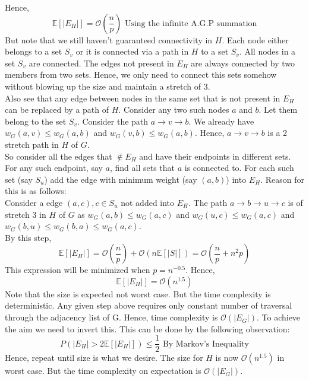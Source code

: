 \documentclass[12pt]{article}
\begin{document}
Hence,
\[ \mathbb{E}[|E_H|] = \mathcal{O}(\frac{n}{p}) \text{\ \ \  Using the infinite A.G.P summation} \]
But note that we still haven't guaranteed connectivity in $H$. Each node either belongs to a set $S_v$ or it is connected via a path in $H$ to a set $S_v$. All nodes in a set $S_v$ are connected. The edges not present in $E_H$ are always connected by two members from two sets. Hence, we only need to connect this sets somehow without blowing up the size and maintain a stretch of 3.
\\
Also see that any edge between nodes in the same set that is not present in $E_H$ can be replaced by a path of $H$.
Consider any two such nodes $a$ and $b$. Let them belong to the set $S_v$. Consider the path $a \rightarrow v \rightarrow b$. We already have $w_G(a, v) \leq w_G(a, b)$ and $w_G(v, b) \leq w_G(a, b)$. Hence, $a \rightarrow v \rightarrow b$ is a 2 stretch path in $H$ of $G$.
\\
So consider all the edges that $\notin E_H$ and have their endpoints in different sets. For any such endpoint, say $a$, find all sets that $a$ is connected to. For each such set (say $S_u$) add the edge with minimum weight (say $(a, b)$) into $E_H$. Reason for this is as follows:
\\
Consider a edge $(a, c), c \in S_u$ not added into $E_H$. The path $a \rightarrow b \rightarrow u \rightarrow c$ is of stretch 3 in $H$ of $G$ as $w_G(a, b) \leq w_G(a, c)$ and $w_G(u, c) \leq w_G(a, c)$ and $w_G(b, u) \leq w_G(b, a) \leq w_G(a, c)$.
\\
By this step,
\[ \mathbb{E}[|E_H|] = \mathcal{O}(\frac{n}{p}) + \mathcal{O}(n\mathbb{E}[|S|]) = \mathcal{O}(\frac{n}{p} + {n^2}{p}) \]
This expression will be minimized when $p = n^{-0.5}$.
Hence,
\[ \mathbb{E}[|E_H|] = \mathcal{O}(n^{1.5}) \]
Note that the size is expected not worst case. But the time complexity is deterministic. Any given step above requires only constant number of traversal through the adjacency list of G.
 Hence, time complexity is $\mathcal{O}(|E_G|)$. To achieve the aim we need to invert this. This can be done by the following observation:
 \[ P(|E_H| > 2\mathbb{E}[|E_H|]) \leq \frac{1}{2} \text{\ \ \ \ By Markov's Inequality} \]
 Hence, repeat until size is what we desire. The size for $H$ is now $\mathcal{O}(n^{1.5})$ in worst case. But the time complexity on expectation is $\mathcal{O}(|E_G|)$.
\end{document}
